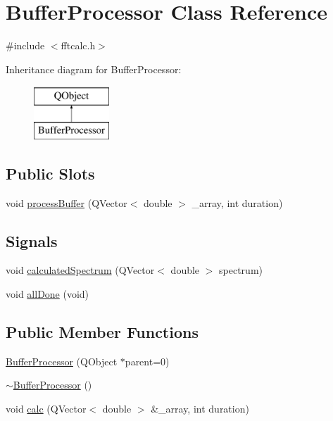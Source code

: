 \hypertarget{class_buffer_processor}{\section{Buffer\-Processor Class Reference}
\label{class_buffer_processor}
}


{\ttfamily \#include $<$fftcalc.\-h$>$}

Inheritance diagram for Buffer\-Processor\-:\begin{figure}[H]
\begin{center}
\leavevmode
\includegraphics[height=2.000000cm]{class_buffer_processor}
\end{center}
\end{figure}
\subsection*{Public Slots}
\begin{DoxyCompactItemize}
\item 
void \hyperlink{class_buffer_processor_a19fedc34939ba4579b9a9bc3c53b7503}{process\-Buffer} (Q\-Vector$<$ double $>$ \-\_\-array, int duration)
\end{DoxyCompactItemize}
\subsection*{Signals}
\begin{DoxyCompactItemize}
\item 
void \hyperlink{class_buffer_processor_a466db3cca5282cd8b1d8c2ad6289ba35}{calculated\-Spectrum} (Q\-Vector$<$ double $>$ spectrum)
\item 
void \hyperlink{class_buffer_processor_a9dd9e6636e0dc2a4a263f045a3338013}{all\-Done} (void)
\end{DoxyCompactItemize}
\subsection*{Public Member Functions}
\begin{DoxyCompactItemize}
\item 
\hyperlink{class_buffer_processor_a910d84b159f28bcaf05b47ce7e81eb0c}{Buffer\-Processor} (Q\-Object $\ast$parent=0)
\item 
\hyperlink{class_buffer_processor_a3bff89bec0e670f7ae5386bfa7937401}{$\sim$\-Buffer\-Processor} ()
\item 
void \hyperlink{class_buffer_processor_af90a936a161872a0a4d4406af2822db9}{calc} (Q\-Vector$<$ double $>$ \&\-\_\-array, int duration)
\end{DoxyCompactItemize}
